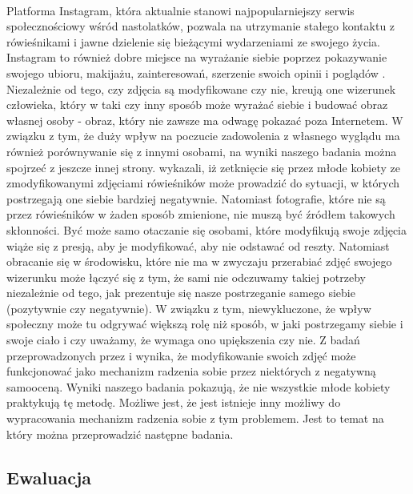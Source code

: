 \documentclass[12pt,a4paper,final,oneside,onecolumn,titlepage]{article}
\begin{document}
\paragraph{}
Platforma Instagram, która aktualnie stanowi najpopularniejszy serwis społecznościowy wśród nastolatków, pozwala na utrzymanie stałego kontaktu z rówieśnikami i jawne dzielenie się bieżącymi wydarzeniami ze swojego życia. Instagram to również dobre miejsce na wyrażanie siebie poprzez pokazywanie swojego ubioru, makijażu, zainteresowań, szerzenie swoich opinii i poglądów \citep{longobardi_follow_2020}. Niezależnie od tego, czy zdjęcia są modyfikowane czy nie, kreują one wizerunek człowieka, który w taki czy inny sposób może wyrażać siebie i budować obraz własnej osoby - obraz, który nie zawsze ma odwagę pokazać poza Internetem. W związku z tym, że duży wpływ na poczucie zadowolenia z własnego wyglądu ma również porównywanie się z innymi osobami, na wyniki naszego badania można spojrzeć z jeszcze innej strony. \citet{kleemans_picture_2018} wykazali, iż zetknięcie się przez młode kobiety ze zmodyfikowanymi zdjęciami rówieśników może prowadzić do sytuacji, w których postrzegają one siebie bardziej negatywnie. Natomiast fotografie, które nie są przez rówieśników w żaden sposób zmienione, nie muszą być  źródłem takowych skłonności. Być może samo otaczanie się osobami, które modyfikują swoje zdjęcia wiąże się z presją, aby je modyfikować, aby nie odstawać od reszty. Natomiast obracanie się w środowisku, które nie ma w zwyczaju przerabiać zdjęć swojego wizerunku może łączyć się z tym, że sami nie odczuwamy takiej potrzeby niezależnie od tego, jak prezentuje się nasze postrzeganie samego siebie (pozytywnie czy negatywnie). W związku z tym, niewykluczone, że wpływ społeczny może tu odgrywać większą rolę niż sposób, w jaki postrzegamy siebie i swoje ciało i czy uważamy, że wymaga ono upiększenia czy nie. Z badań przeprowadzonych przez \citet{kleemans_picture_2018} i \citet{lyu_travel_2016} wynika, że modyfikowanie swoich zdjęć może funkcjonować jako mechanizm radzenia sobie przez niektórych z negatywną samooceną. Wyniki naszego badania pokazują, że nie wszystkie młode kobiety praktykują tę metodę. Możliwe jest, że jest istnieje inny możliwy do wypracowania mechanizm radzenia sobie z tym problemem. Jest to temat na który można przeprowadzić następne badania.
\subsection*{\normalsize{\textbf{Ewaluacja}}}
\end{document}
